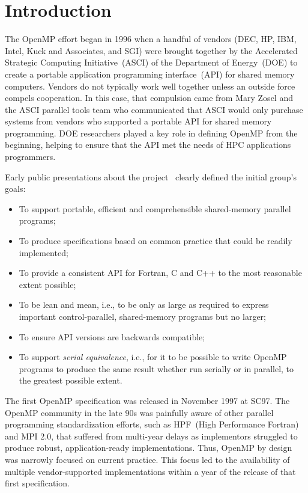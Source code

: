 \section{Introduction}
\label{sec:intro}

The OpenMP effort began in 1996 when a handful of vendors (DEC, HP, IBM, 
Intel, Kuck and Associates, and SGI) were brought together by the Accelerated 
Strategic Computing Initiative~(ASCI) of the Department of Energy~(DOE) to 
create a portable application programming interface~(API) for shared memory 
computers. Vendors do not typically work well together unless an outside 
force compels cooperation. In this case, that compulsion came from Mary 
Zosel and the ASCI parallel tools team who communicated that ASCI would 
only purchase systems from vendors who supported a portable API for shared 
memory programming. DOE researchers played a key role in defining OpenMP 
from the beginning, helping to ensure that the API met the needs of HPC 
applications programmers.

Early public presentations about the project~\cite{ewomp99} clearly
defined the initial group's goals:

\begin{itemize}
  \item To support portable, efficient and comprehensible shared-memory 
        parallel programs;
  \item To produce specifications based on common practice that 
        could be readily implemented;
  \item To provide a consistent API for Fortran, C and C++ to the 
        most reasonable extent possible;
  \item To be lean and mean, i.e., to  be only as large as required 
        to express important control-parallel, shared-memory programs  
        but no larger;
  \item To ensure API versions are backwards compatible;
  \item To support \emph{serial equivalence}, i.e., for it to be possible to
    write OpenMP programs to produce the same result whether run serially or in
        parallel, to the greatest possible extent.
\end{itemize}

The first OpenMP specification  was released in November 1997 at SC97. The
OpenMP community in the late 90s was painfully aware of other parallel
programming  standardization efforts, such as HPF~(High Performance Fortran) and MPI 2.0, that
suffered from multi-year delays as implementors struggled to produce robust,
application-ready implementations. Thus, OpenMP by design was narrowly
focused on current practice. This focus led to the availability of multiple
vendor-supported implementations within a year of the release of that 
first specification. 

